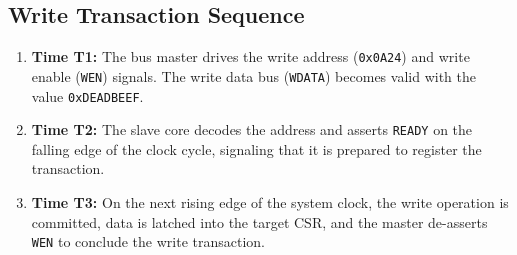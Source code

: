 \subsection{Write Transaction Sequence}
\begin{enumerate}
    \item \textbf{Time T1:} The bus master drives the write address (\texttt{0x0A24}) and write enable (\texttt{WEN}) signals. The write data bus (\texttt{WDATA}) becomes valid with the value \texttt{0xDEADBEEF}.
    \item \textbf{Time T2:} The slave core decodes the address and asserts \texttt{READY} on the falling edge of the clock cycle, signaling that it is prepared to register the transaction.
    \item \textbf{Time T3:} On the next rising edge of the system clock, the write operation is committed, data is latched into the target CSR, and the master de-asserts \texttt{WEN} to conclude the write transaction.
\end{enumerate}

